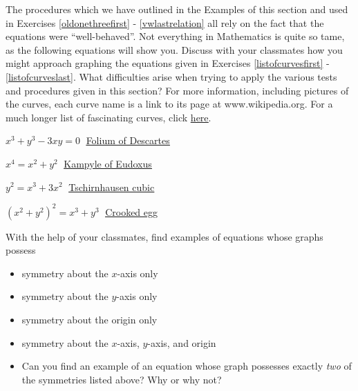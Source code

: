 \documentclass{ximera}
\begin{document}
\begin{question}
The procedures which we have outlined in the Examples of this section and used in Exercises \ref{oldonethreefirst} -  \ref{vwlastrelation} all rely on the fact that the equations were ``well-behaved''.  Not everything in Mathematics is quite so tame, as the following equations will show you.  Discuss with your classmates how you might approach graphing the equations given in Exercises \ref{listofcurvesfirst} - \ref{listofcurveslast}.  What difficulties arise when trying to apply the various tests and procedures given in this section?  For more information, including pictures of the curves, each curve name is a link to its page at www.wikipedia.org.  For a much longer list of fascinating curves, click \href{http://en.wikipedia.org/wiki/List_of_curves}{\underline{here}}.


\begin{problem} \label{listofcurvesfirst}
$x^{3} + y^{3} - 3xy = 0\;$ \href{http://en.wikipedia.org/wiki/Folium_of_descartes}{\underline{Folium of Descartes}}
\end{problem}

\begin{problem}
$x^{4} = x^{2} + y^{2}\;$ \href{http://en.wikipedia.org/wiki/Kampyle_of_Eudoxus}{\underline{Kampyle of Eudoxus}}
\end{problem}

\begin{problem}
$y^{2} = x^{3} + 3x^{2}\;$ \href{http://en.wikipedia.org/wiki/Tschirnhausen_cubic}{\underline{Tschirnhausen cubic}}
\end{problem}

\begin{problem} \label{listofcurveslast}
$(x^{2} + y^{2})^{2} = x^{3} + y^{3}\;$ \href{https://en.wikipedia.org/wiki/File:Crooked_egg_curve.svg}{\underline{Crooked egg}} 

\end{problem}
\end{question}

\begin{problem}
With the help of your classmates, find examples of equations whose graphs possess 

\begin{itemize}
    
\item symmetry about the $x$-axis only

\item symmetry about the $y$-axis only

\item 
symmetry about the origin only

\item 
symmetry about the $x$-axis, $y$-axis, and origin

\item 
Can you find an example of an equation whose graph possesses exactly \textit{two} of the symmetries listed above?  Why or why not?
\end{itemize}

\end{problem}
\end{document}
